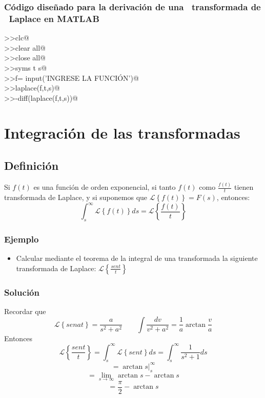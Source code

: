 \documentclass[12pt,a4paper,twoside,onecolumn,openany]{book}
\begin{document}
\subsection{Código diseñado para la derivación de una ~\mbox{transformada} de ~\mbox{Laplace} en MATLAB}
\verb@>>clc@
\\
\verb@>>clear all@
\\
\verb@>>close all@
\\
\verb@>>syms t s@
\\
\verb@>>f= input('INGRESE LA FUNCIÓN')@
\\
\verb@>>laplace(f,t,s)@
\\
\verb@>>-diff(laplace(f,t,s))@
\chapter{Integración de las transformadas}
\section{Definición}
Si $f(t)$ es una función de orden exponencial, si tanto $f(t)$ como $\frac{f(t)}{t}$ tienen transformada de Laplace, y si suponemos que $\mathcal { L } \left\lbrace {{ f ( t )  }}\right\rbrace = F(s)$, entonces:
\[
\int_ { s } ^ { \infty }\mathcal { L } \left\lbrace {{ f ( t )  }}\right\rbrace ds= \mathcal { L } \left\lbrace {{ \frac{f(t)}{t}  }}\right\rbrace
\]
\subsection{Ejemplo}
\begin{itemize}
\item Calcular mediante el teorema de la integral de una transformada la  siguiente transformada de Laplace:
$\mathcal { L } \left\lbrace { \frac{sent}{t}}\right\rbrace$
\end{itemize}
\subsection{Solución}
Recordar que 
\[\mathcal { L } \left\lbrace { sen a t   }\right\rbrace = \frac{a}{s^{2}+a^{2}}  \qquad \int \frac{dv}{v^{2}+a^{2}}=\frac{1}{a}\arctan \frac{v}{a}
\]   
Entonces
\[
    \mathcal { L } \left\lbrace { \frac{sent}{t}}\right\rbrace  = \int_ { s } ^ { \infty }\mathcal { L } \left\lbrace {{ sen  t   }}\right\rbrace ds= \int_ { s } ^ { \infty } \frac{1}{s^{2}+1} ds
\]
\[
=\arctan s\vert_{s}^ { \infty }
\]
\[
=\lim_{s \to \infty} \arctan s-\arctan s
\]
\[
=\frac{\pi}{2} -\arctan s
\]
\end{document}
